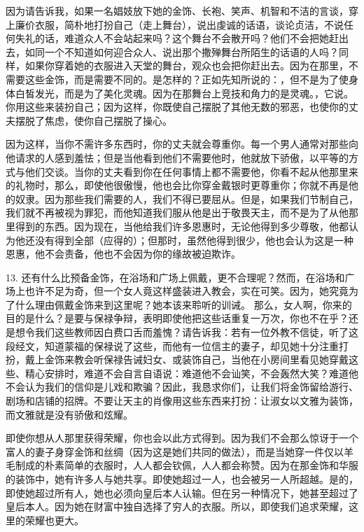 因为请告诉我，如果一名娼妓放下她的金饰、长袍、笑声、机智和不洁的言谈，穿上廉价衣服，简朴地打扮自己（走上舞台），说出虔诚的话语，谈论贞洁，不说任何失礼的话，难道众人不会站起来吗？这个舞台不会散开吗？他们不会把她赶出去，如同一个不知道如何迎合众人、说出那个撒殚舞台所陌生的话语的人吗？同样，如果你穿着她的衣服进入天堂的舞台，观众也会把你赶出去。因为在那里，不需要这些金饰，而是需要不同的。是怎样的？正如先知所说的：，但不是为了使身体白皙发光，而是为了美化灵魂。因为在那舞台上竞技和角力的是灵魂。，它说。你用这些来装扮自己；因为这样，你既使自己摆脱了其他无数的邪恶，也使你的丈夫摆脱了焦虑，使你自己摆脱了操心。\par

因为这样，当你不需许多东西时，你的丈夫就会尊重你。每一个男人通常对那些向他请求的人感到羞怯；但是当他看到他们不需要他时，他就放下骄傲，以平等的方式与他们交谈。当你的丈夫看到你在任何事情上都不需要他，你看不起从他那里来的礼物时，那么，即使他很傲慢，他也会比你穿金戴银时更尊重你；你就不再是他的奴隶。因为那些我们需要的人，我们不得已要屈从。但是，如果我们节制自己，我们就不再被视为罪犯，而他知道我们服从他是出于敬畏天主，而不是为了从他那里得到的东西。因为现在，当他给我们许多恩惠时，无论他得到多少尊敬，他都认为他还没有得到全部（应得的）；但那时，虽然他得到很少，他也会认为这是一种恩惠，他不会责备，他也不会因为你的缘故被迫欺诈。\par

13. 还有什么比预备金饰，在浴场和广场上佩戴，更不合理呢？然而，在浴场和广场上也许不足为奇，但一个女人竟这样盛装进入教会，实在可笑。因为，她究竟为了什么理由佩戴金饰来到这里呢？她本该来聆听的训诫。 那么，女人啊，你来的目的是什么？是要与保禄争辩，表明即使他把这些话重复一万次，你也不在乎？还是想令我们这些教师因白费口舌而羞愧？请告诉我：若有一位外教不信徒，听了这段经文，知道蒙福的保禄说了这些，而他有一位信主的妻子，却见她十分注重打扮，戴上金饰来教会听保禄告诫妇女、或装饰自己，当他在小房间里看见她穿戴这些、精心安排时，难道不会自言自语说：难道他不会讪笑，不会轰然大笑？难道他不会认为我们的信仰是儿戏和欺骗？因此，我恳求你们，让我们将金饰留给游行、剧场和店铺的招牌。不要让天主的肖像用这些东西来打扮：让淑女以文雅为装饰，而文雅就是没有骄傲和炫耀。\par

即使你想从人那里获得荣耀，你也会以此方式得到。因为我们不会那么惊讶于一个富人的妻子身穿金饰和丝绸（因为这是她们共同的做法），而是当她穿一件仅以羊毛制成的朴素简单的衣服时，人人都会钦佩，人人都会称赞。因为在那金饰和华服的装饰中，她有许多人与她共享。即使她超过一人，也会被另一人所超越。是的，即使她超过所有人，她也必须向皇后本人认输。但在另一种情况下，她甚至超过了皇后本人。因为她在财富中独自选择了穷人的衣服。所以，即使我们追求荣耀，这里的荣耀也更大。\par

